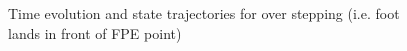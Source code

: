 \begin{figure}[!h]
	\begin{center}
	\end{center}
  	\caption{Time evolution and state trajectories for over stepping (i.e. foot lands in front of FPE point)}
	\label{sim:over}
\end{figure}


